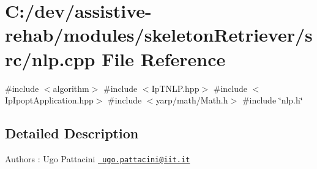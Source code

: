 \section{C\+:/dev/assistive-\/rehab/modules/skeleton\+Retriever/src/nlp.cpp File Reference}
\label{nlp_8cpp}
{\ttfamily \#include $<$algorithm$>$}\newline
{\ttfamily \#include $<$Ip\+T\+N\+L\+P.\+hpp$>$}\newline
{\ttfamily \#include $<$Ip\+Ipopt\+Application.\+hpp$>$}\newline
{\ttfamily \#include $<$yarp/math/\+Math.\+h$>$}\newline
{\ttfamily \#include \char`\"{}nlp.\+h\char`\"{}}\newline


\subsection{Detailed Description}
\begin{DoxyAuthor}{Authors}
\+: Ugo Pattacini \href{mailto:ugo.pattacini@iit.it}{\texttt{ ugo.\+pattacini@iit.\+it}} 
\end{DoxyAuthor}
